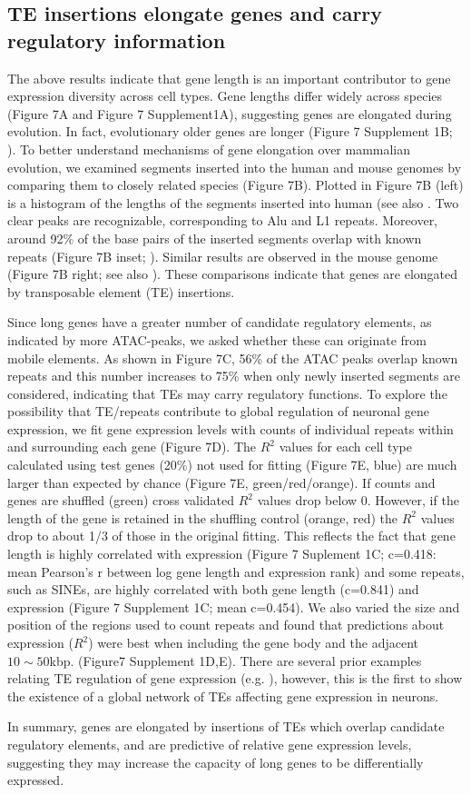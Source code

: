 \subsection{TE insertions elongate genes and carry regulatory information}

The above results indicate that gene length is an important contributor to gene expression diversity across cell types. Gene lengths differ widely across species (Figure 7A and Figure 7 Supplement1A), suggesting genes are elongated during evolution. In fact, evolutionary older genes are longer (Figure 7 Supplement 1B; \cite{Grishkevich_2014}). To better understand mechanisms of gene elongation over mammalian evolution, we examined segments inserted into the human and mouse genomes by comparing them to closely related species (Figure 7B). Plotted in Figure 7B (left) is a histogram of the lengths of the segments inserted into human (see also \cite{Mikkelsen_2005}. Two clear peaks are recognizable, corresponding to Alu and L1 repeats. Moreover, around 92\% of the base pairs of the inserted segments overlap with known repeats (Figure 7B inset; \cite{Bao_2015}). Similar results are observed in the mouse genome (Figure 7B right; see also \cite{Pozzoli_2007}). These comparisons indicate that genes are elongated by transposable element (TE) insertions. 

Since long genes have a greater number of candidate regulatory elements, as indicated by more ATAC-peaks, we asked whether these can originate from mobile elements. As shown in Figure 7C, 56\% of the ATAC peaks overlap known repeats and this number increases to 75\% when only newly inserted segments are considered, indicating that TEs may carry regulatory functions. To explore the possibility that TE/repeats contribute to global regulation of neuronal gene expression, we fit gene expression levels with counts of individual repeats within and surrounding each gene (Figure 7D).  The $R^2$ values for each cell type calculated using test genes (20\%) not used for fitting (Figure 7E, blue) are much larger than expected by chance (Figure 7E, green/red/orange). If counts and genes are shuffled (green) cross validated $R^2$ values drop below 0. However, if the length of the gene is retained in the shuffling control (orange, red) the $R^2$ values drop to about 1/3 of those in the original fitting. This reflects the fact that gene length is highly correlated with expression (Figure 7 Suplement 1C; c=0.418: mean Pearson's r between log gene length and expression rank) and some repeats, such as SINEs, are highly correlated with both gene length (c=0.841) and expression (Figure 7 Supplement 1C; mean c=0.454). We also varied the size and position of the regions used to count repeats and found that predictions about expression ($R^2$) were best when including the gene body and the adjacent $10\sim 50$kbp. (Figure7 Supplement 1D,E). There are several prior examples relating TE regulation of gene expression (e.g. \cite{Han_2004,Chuong_2016a}), however, this is the first to show the existence of a global network of TEs affecting gene expression in neurons. 

In summary, genes are elongated by insertions of TEs which overlap candidate regulatory elements, and are predictive of relative gene expression levels, suggesting they may increase the capacity of long genes to be differentially expressed. 


